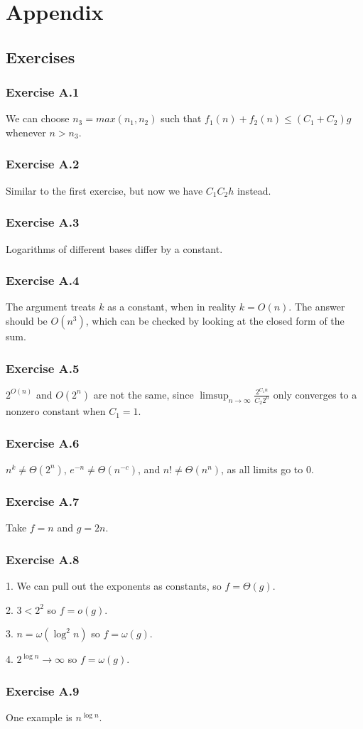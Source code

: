 \section{Appendix}

\subsection{Exercises}

\subsubsection{Exercise A.1}
We can choose $n_3 = max(n_1, n_2)$ such that $f_1(n) + f_2(n) \leq (C_1 + C_2)g$ whenever
$n > n_3$.

\subsubsection{Exercise A.2}
Similar to the first exercise, but now we have $C_1 C_2 h$ instead.

\subsubsection{Exercise A.3}
Logarithms of different bases differ by a constant.

\subsubsection{Exercise A.4}
The argument treats $k$ as a constant, when in reality $k = O(n)$. The answer should be
$O(n^3)$, which can be checked by looking at the closed form of the sum.

\subsubsection{Exercise A.5}
$2^{O(n)}$ and $O(2^{n})$ are not the same, since $\limsup_{n \to  \infty} \frac{2^{C_1n}}{C_{2}2^n}$
only converges to a nonzero constant when $C_1 = 1$.

\subsubsection{Exercise A.6}
$n^{k} \neq \Theta(2^n)$, $e^{-n} \neq \Theta(n^{-c})$, and $n! \neq \Theta(n^n)$, as all limits go to 0.

\subsubsection{Exercise A.7}
Take $f = n$ and $g = 2n$. 

\subsubsection{Exercise A.8}
1. We can pull out the exponents as constants, so $f = \Theta(g)$.

2. $3 < 2^2$ so $f = o(g)$.

3. $n = \omega(\log^2 n)$ so $f = \omega(g)$.

4. $2^{\log n} \to \infty$ so $f = \omega(g)$.

\subsubsection{Exercise A.9}
One example is $n^{\log n}$.

